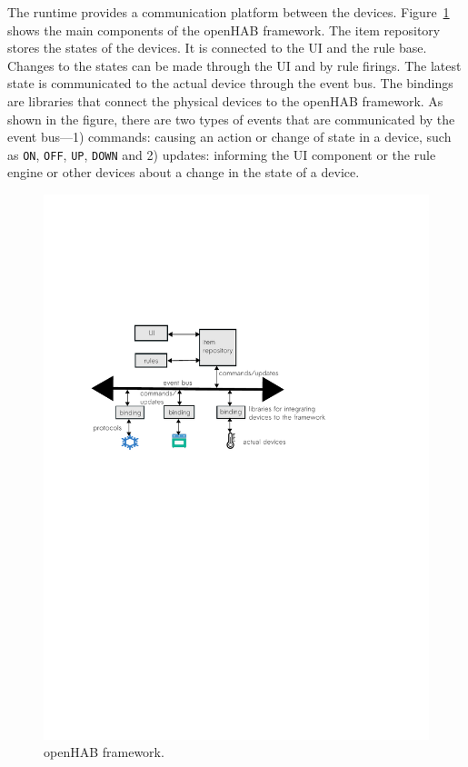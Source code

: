 \documentclass{sig-alternate-05-2015}
\begin{document}
The runtime provides a communication platform between the devices. 
Figure~\ref{fig:framework} shows the main components of the openHAB framework. The item repository stores the states of the devices. It is connected to the UI and the rule base. Changes to the states can be made through the UI and by rule firings. The latest state is communicated to the actual device through the event bus. The bindings are libraries that connect the physical devices to the openHAB framework. As shown in the figure, there are two types of events that are communicated by the event bus---1) commands: causing an action or change of state in a device, such as \texttt{ON}, \texttt{OFF}, \texttt{UP}, \texttt{DOWN} and 2) updates: informing the UI component or the rule engine or other devices about a change in the state of a device.
\begin{figure}
\centering
\includegraphics [trim=2cm 15cm 0 7.5cm, scale=0.6]{images/framework.pdf}
\caption{openHAB framework.}
\label{fig:framework}
\end{figure} 
\end{document}
